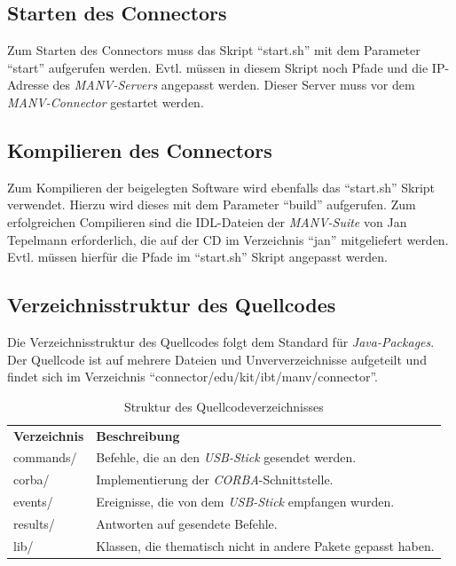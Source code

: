     \subsection{Starten des Connectors}

    Zum Starten des Connectors muss das Skript "`start.sh"' mit dem Parameter
    "`start"' aufgerufen werden. Evtl. müssen in diesem Skript noch Pfade
    und die IP-Adresse des \emph{MANV-Servers} angepasst werden. 
    Dieser Server muss vor dem \emph{MANV-Connector} gestartet werden.

    \subsection{Kompilieren des Connectors}

    Zum Kompilieren der beigelegten Software wird ebenfalls das "`start.sh"'
    Skript verwendet. Hierzu wird dieses mit dem Parameter "`build"' aufgerufen.
    Zum erfolgreichen Compilieren sind die IDL-Dateien der \emph{MANV-Suite}
    von Jan Tepelmann erforderlich, die auf der CD im Verzeichnis "`jan"'
    mitgeliefert werden. Evtl. müssen hierfür die Pfade im "`start.sh"'
    Skript angepasst werden.

    \subsection{Verzeichnisstruktur des Quellcodes}

    Die Verzeichnisstruktur des Quellcodes folgt dem Standard für \emph{Java-Packages}.
    Der Quellcode ist auf mehrere Dateien und Unververzeichnisse aufgeteilt
    und findet sich im Verzeichnis "`connector/edu/kit/ibt/manv/connector"'.
    
    \begin{table}
        \begin{tabular}{ll}
            \textbf{Verzeichnis} & \textbf{Beschreibung}\\

           commands/ & Befehle, die an den \emph{USB-Stick} gesendet werden.\\
           corba/    & Implementierung der \emph{CORBA}-Schnittstelle.\\
           events/   & Ereignisse, die von dem \emph{USB-Stick} empfangen wurden.\\
           results/  & Antworten auf gesendete Befehle.\\
           lib/      & Klassen, die thematisch nicht in andere Pakete gepasst haben.\\
        \end{tabular}
        \caption{Struktur des Quellcodeverzeichnisses}
    \end{table}

